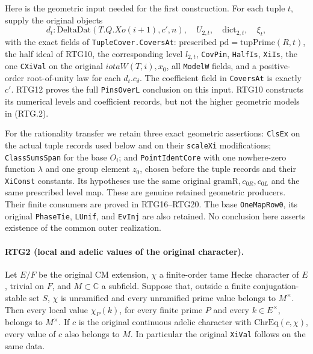 Here is the geometric input needed for the first construction.  For each
tuple $t$, supply the original objects
\[
 d_t:\mathrm{DeltaDat}(T.Q.Xo(i+1),c',n),\quad
 U_{2,t},\quad\mathrm{dict}_{2,t},\quad\xi_t,
                                                               \tag{RTG.2}
\]
with the exact fields of \texttt{TupleCover.CoversAt}: prescribed
$\mathrm{pd}=\mathrm{tupPrime}(R,t)$, the half ideal of RTG10,
the corresponding level $l_{2,t}$, \texttt{CovPin}, \texttt{HalfIs},
\texttt{XiIs}, the one \texttt{CXiVal} on the original
$iotaW(T,i),x_0$, all \texttt{ModelW} fields, and a positive-order
root-of-unity law for each $d_t.c_\delta$.  The coefficient field in
\texttt{CoversAt} is exactly $c'$.  RTG12 proves the full \texttt{PinsOverL}
conclusion on this input.  RTG10 constructs its numerical levels and
coefficient records, but not the higher geometric models in (RTG.2).

For the rationality transfer we retain three exact geometric assertions:
\texttt{ClsEx} on the actual tuple records used below and on their
\texttt{scaleXi} modifications; \texttt{ClassSumsSpan} for the base $O_i$;
and \texttt{PointIdentCore} with one nowhere-zero function $\lambda$ and
one group element $z_0$, chosen before the tuple records and their
\texttt{XiConst} constants.  Its hypotheses use the same original
$\mathrm{gramR},c_{0R},c_{0L}$ and the same prescribed level map.
These are genuine retained geometric producers.  Their finite consumers
are proved in RTG16--RTG20.  The base \texttt{OneMapRow0}, its original
\texttt{PhaseTie}, \texttt{LUnif}, and \texttt{EvInj} are also retained.
No conclusion here asserts existence of the common outer realization.

\paragraph{RTG2 (local and adelic values of the original character).}
\label{claim:RTG2}
Let $E/F$ be the original CM extension, $\chi$ a finite-order tame
Hecke character of $E$, trivial on $F$, and $M\subset\mathbb C$ a
subfield.  Suppose that, outside a finite conjugation-stable set $S$,
$\chi$ is unramified and every unramified prime value belongs to
$M^\times$.  Then every local value $\chi_P(k)$, for every finite prime
$P$ and every $k\in E^\times$, belongs to $M^\times$.
If $c$ is the original continuous adelic character with
$\mathrm{ChrEq}(c,\chi)$, every value of $c$ also belongs to $M$.
In particular the original \texttt{XiVal} follows on the same data.

